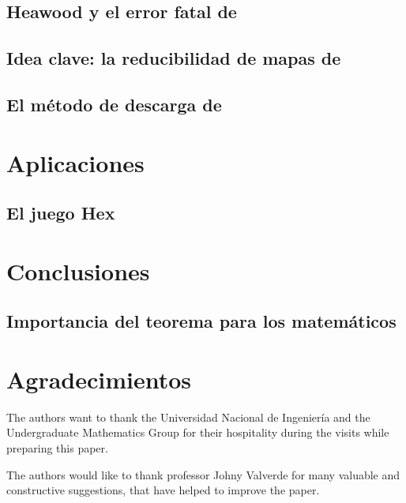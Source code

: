\documentclass[3p,times,a4paper,twocolumn,authoryear]{elsarticle} %
\begin{document}
\subsection{Heawood y el error fatal de \citeauthor{kempe}}

\subsection{Idea clave: la reducibilidad de mapas de \citeauthor{birkhoff}}

\subsection{El método de descarga de \citeauthor{appel}}

\section{Aplicaciones}

\subsection{El juego Hex}

\section{Conclusiones}

\subsection{Importancia del teorema para los matemáticos}

\section*{Agradecimientos}

The authors want to thank the Universidad Nacional de Ingeniería and the Undergraduate Mathematics Group for their hospitality during the visits while preparing this paper.

The authors would like to thank professor Johny Valverde for many valuable and constructive suggestions, that have helped to improve the paper.

\nocite{*}
\printbibliography[title={Referencias}]
\end{document}
